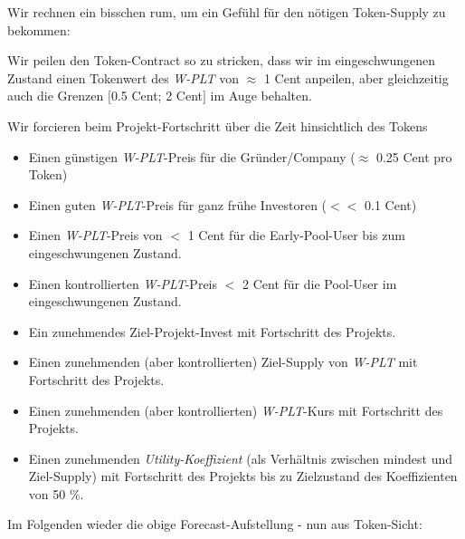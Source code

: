 \vspace{0.5cm}

Wir rechnen ein bisschen rum, um ein Gefühl für den nötigen Token-Supply zu bekommen:

\vspace{0.3cm}

\begin{Example}

Wir peilen den Token-Contract so zu stricken, dass wir im eingeschwungenen Zustand einen Tokenwert des \textit{W-PLT} von $\approx$ 1 Cent anpeilen, aber gleichzeitig auch die Grenzen $[$0.5 Cent; 2 Cent$]$ im Auge behalten.

\vspace{0.5cm}

Wir forcieren beim Projekt-Fortschritt über die Zeit hinsichtlich des Tokens

\begin{itemize}
	\item Einen günstigen \textit{W-PLT}-Preis für die Gründer/Company ($\approx$ 0.25 Cent pro Token)
	\item Einen guten \textit{W-PLT}-Preis für ganz frühe Investoren ($<<$ 0.1 Cent)
	\item Einen \textit{W-PLT}-Preis von $<$ 1 Cent für die Early-Pool-User bis zum eingeschwungenen Zustand.
	\item Einen kontrollierten \textit{W-PLT}-Preis $<$ 2 Cent für die Pool-User im eingeschwungenen Zustand.
	\item Ein zunehmendes Ziel-Projekt-Invest mit Fortschritt des Projekts.
	\item Einen zunehmenden (aber kontrollierten) Ziel-Supply von \textit{W-PLT} mit Fortschritt des Projekts.
	\item Einen zunehmenden (aber kontrollierten) \textit{W-PLT}-Kurs mit Fortschritt des Projekts.
	\item Einen zunehmenden \textit{Utility-Koeffizient} (als Verhältnis zwischen mindest und Ziel-Supply) mit Fortschritt des Projekts bis zu Zielzustand des Koeffizienten von 50 \%.
\end{itemize}

\vspace{1.0cm}

Im Folgenden wieder die obige Forecast-Aufstellung - nun aus Token-Sicht:



\end{Example}
